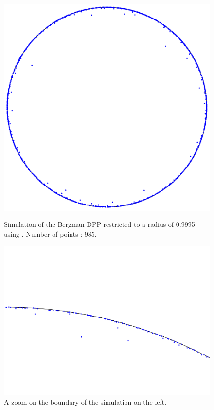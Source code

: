 \documentclass[11pt]{article}
\begin{document}
\begin{figure}[h]
    \centering
    \begin{minipage}{0.45\textwidth}
        \centering
        \includegraphics[width=\linewidth]{bergman.png} %
        \caption{Simulation of the Bergman DPP restricted to a radius of 0.9995, using \cite{MorozSoftware}. Number of points : 985.}
    \end{minipage}
    \hfill
    \begin{minipage}{0.45\textwidth}
        \centering
        \includegraphics[width=\linewidth]{bergman_zoom.png} %
        \caption{A zoom on the boundary of the simulation on the left.}
    \end{minipage}
\end{figure}
\end{document}
